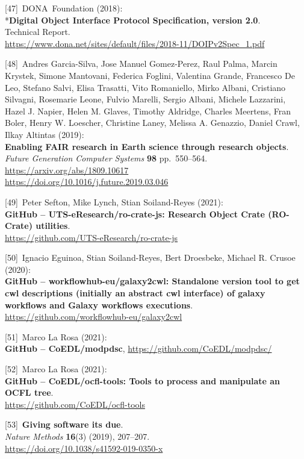 {[}47{]}~DONA~Foundation (2018):\\
*\textbf{Digital Object Interface Protocol Specification, version
2.0}.\\
Technical Report.\\
\url{https://www.dona.net/sites/default/files/2018-11/DOIPv2Spec_1.pdf}

{[}48{]}~Andres Garcia-Silva, Jose Manuel Gomez-Perez, Raul Palma,
Marcin Krystek, Simone Mantovani, Federica Foglini, Valentina Grande,
Francesco De Leo, Stefano Salvi, Elisa Trasatti, Vito Romaniello, Mirko
Albani, Cristiano Silvagni, Rosemarie Leone, Fulvio Marelli, Sergio
Albani, Michele Lazzarini, Hazel J. Napier, Helen M. Glaves, Timothy
Aldridge, Charles Meertens, Fran Boler, Henry W. Loescher, Christine
Laney, Melissa A. Genazzio, Daniel Crawl, Ilkay Altintas (2019):\\
\textbf{Enabling FAIR research in Earth science through research
objects}.\\
\emph{Future Generation Computer Systems} \textbf{98} pp.~550--564.\\
\url{https://arxiv.org/abs/1809.10617}~\\
\url{https://doi.org/10.1016/j.future.2019.03.046}

{[}49{]}~Peter Sefton, Mike Lynch, Stian Soiland-Reyes (2021):\\
\textbf{GitHub -- UTS-eResearch/ro-crate-js: Research Object Crate
(RO-Crate) utilities}.\\
\url{https://github.com/UTS-eResearch/ro-crate-js}

{[}50{]}~Ignacio Eguinoa, Stian Soiland-Reyes, Bert Droesbeke, Michael
R. Crusoe (2020):\\
\textbf{GitHub -- workflowhub-eu/galaxy2cwl: Standalone version tool to
get cwl descriptions (initially an abstract cwl interface) of galaxy
workflows and Galaxy workflows executions}.\\
\url{https://github.com/workflowhub-eu/galaxy2cwl}

{[}51{]}~Marco La Rosa (2021):\\
\textbf{GitHub -- CoEDL/modpdsc},
\url{https://github.com/CoEDL/modpdsc/}

{[}52{]}~Marco La Rosa (2021):\\
\textbf{GitHub -- CoEDL/ocfl-tools: Tools to process and manipulate an
OCFL tree}.\\
\url{https://github.com/CoEDL/ocfl-tools}

{[}53{]}~\textbf{Giving software its due}.\\
\emph{Nature Methods} \textbf{16}(3) (2019), 207--207.\\
\url{https://doi.org/10.1038/s41592-019-0350-x}

